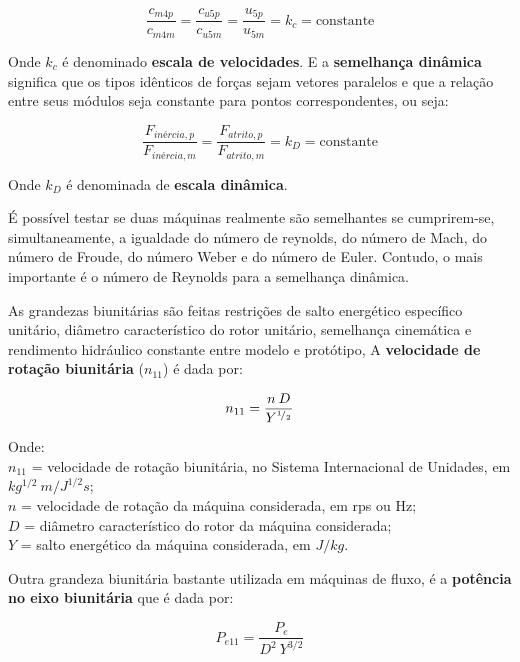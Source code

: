     \begin{equation}
    \frac{c_{m4p}}{c_{m4m}} = \frac{c_{u5p}}{c_{u5m}} = \frac{u_{5p}}{u_{5m}} = k_c = \mbox{constante}     \end{equation}

    Onde $k_c$ é denominado \textbf{escala de velocidades}. E a \textbf{semelhança dinâmica} significa que os tipos idênticos de forças sejam vetores paralelos e que a relação entre seus módulos seja constante para pontos correspondentes, ou seja:

    \begin{equation}
        \frac{F_{inércia,p}}{F_{inércia,m}} = \frac{F_{atrito,p}}{F_{atrito,m}} = k_D = \mbox{constante}
    \end{equation}

    Onde $k_D$ é denominada de \textbf{escala dinâmica}.

    É possível testar se duas máquinas realmente são semelhantes se cumprirem-se, simultaneamente, a igualdade do número de reynolds, do número de Mach, do número de Froude, do número Weber e do número de Euler. Contudo, o mais importante é o número de Reynolds para a semelhança dinâmica.

     As grandezas biunitárias são feitas restrições de salto energético específico unitário, diâmetro característico do rotor unitário, semelhança cinemática e rendimento hidráulico constante entre modelo e protótipo, A \textbf{velocidade de rotação biunitária} ($n_{11}$) é dada por:

     \begin{equation} \label{eq-vel-bi}
         n_{11} = \frac{n\: D}{Y^{{}^{1}\!/_{2}}}
    \end{equation}

    \noindent
    Onde: \\
    $n_{11}$ = velocidade de rotação biunitária, no Sistema Internacional de Unidades, em $kg^{1/2}\: m/J^{1/2}s$; \\
    $n$ = velocidade de rotação da máquina considerada, em rps ou Hz; \\
    $D$ = diâmetro característico do rotor da máquina considerada; \\
    $Y$ = salto energético da máquina considerada, em $J/kg$.

    Outra grandeza biunitária bastante utilizada em máquinas de fluxo, é a \textbf{potência no eixo biunitária} que é dada por:

    \begin{equation} \label{eq-pot-bi}
        P_{e11} = \frac{P_e}{D^2 \: Y^{3/2}}
    \end{equation}

